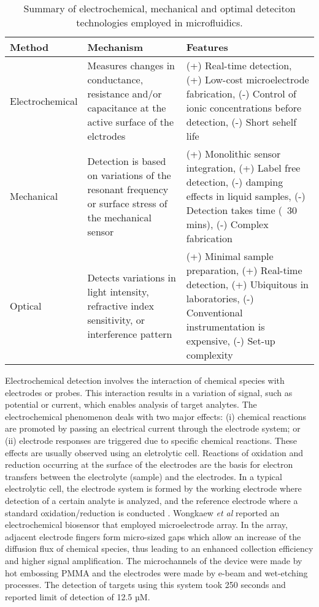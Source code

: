 \newpage

\begin{table}
\begin{center}
    \label{tab:detectors}
    \begin{tabular}{|p{5cm}||p{5cm}||p{5cm}|}\hline\hline
      Method & Mechanism & Features \\ \hline
      Electrochemical & Measures changes in conductance, resistance and/or capacitance at the active surface of the elctrodes  &
      (+) Real-time detection, (+) Low-cost microelectrode fabrication, (-) Control of ionic concentrations before detection, (-) Short sehelf life  \\ \hline
      Mechanical & Detection is based on variations of the resonant frequency or surface stress of the mechanical sensor &
      (+) Monolithic sensor integration, (+) Label free detection, (-) damping effects in liquid samples, (-) Detection takes time (~30 mins), (-) Complex fabrication  \\ \hline
      Optical & Detects variations in light intensity, refractive index sensitivity, or interference pattern &
      (+) Minimal sample preparation, (+) Real-time detection, (+) Ubiquitous in laboratories, (-) Conventional instrumentation is expensive, (-) Set-up complexity \\ \hline\hline
    \end{tabular}
\caption{Summary of electrochemical, mechanical and optimal deteciton technologies employed in microfluidics.}
\end{center}
\end{table}

Electrochemical detection involves the interaction of chemical species with electrodes or probes. This interaction
results in a variation of signal, such as potential or current, which enables analysis of target analytes. The
electrochemical phenomenon deals with two major effects: (i) chemical reactions are promoted by passing an
electrical current through the electrode system; or (ii) electrode responses are triggered due to specific chemical reactions. These
effects are usually observed using an eletrolytic cell. Reactions of oxidation and reduction occurring at the surface of the electrodes
are the basis for electron transfers between the electrolyte (sample) and the electrodes. In a typical
electrolytic cell, the electrode system is formed by the working electrode where detection of a certain
analyte is analyzed, and the reference electrode where a standard oxidation/reduction is conducted \citep{flanagan2005electrochemical}.
Wongkaew \textit{et al} reported an electrochemical biosensor that employed microelectrode array. In
the array, adjacent electrode fingers form micro-sized gaps which allow an increase of the diffusion flux
of chemical species, thus leading to an enhanced collection efficiency and higher signal amplification.
The microchannels of the device were made by hot embossing PMMA and the electrodes were made by e-beam
and wet-etching processes. The detection of targets using this system took 250 seconds and reported
limit of detection of 12.5 µM.

